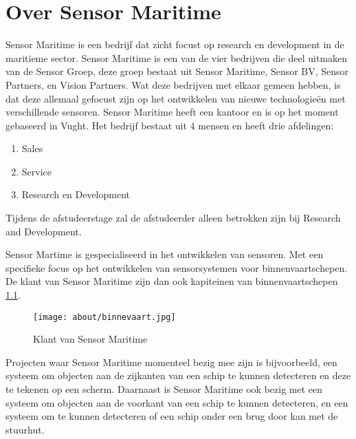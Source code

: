 \chapter{Over Sensor Maritime}
Sensor Maritime is een bedrijf dat zicht focust op research en development in de maritieme sector. Sensor Maritime is een van de vier bedrijven die deel uitmaken van de Sensor Groep, deze groep bestaat uit Sensor Maritime, Sensor BV, Sensor Partners, en Vision Partners. Wat deze bedrijven met elkaar gemeen hebben, is dat deze allemaal gefocust zijn op het ontwikkelen van nieuwe technologieën met verschillende sensoren. Sensor Maritime heeft een kantoor en is op het moment gebaseerd in Vught. Het bedrijf bestaat uit 4 mensen en heeft drie afdelingen:
\begin{enumerate}
	\item Sales
	\item Service
	\item Research en Development
\end{enumerate}
Tijdens de afstudeerstage zal de afstudeerder alleen betrokken zijn bij Research and Development.
\newline

\noindent Sensor Martime is gespecialiseerd in het ontwikkelen van sensoren. Met een specifieke focus op het ontwikkelen van sensorsystemen voor binnenvaartschepen. De klant van Sensor Maritime zijn dan ook kapiteinen van binnenvaartschepen \ref{fig:customer_sensor_maritime}.
\begin{figure}[h!]

	\centering
	\caption{Klant van Sensor Maritime}
	\label{fig:customer_sensor_maritime}
	\texttt{[image: about/binnevaart.jpg]}
	

\end{figure}

\noindent Projecten waar Sensor Maritime momenteel bezig mee zijn is bijvoorbeeld, een systeem om objecten aan de zijkanten van een schip te kunnen detecteren en deze te tekenen op een scherm. Daarnaast is Sensor Maritime ook bezig met een systeem om objecten aan de voorkant van een schip te kunnen detecteren, en een systeem om te kunnen detecteren of een schip onder een brug door kan met de stuurhut.
